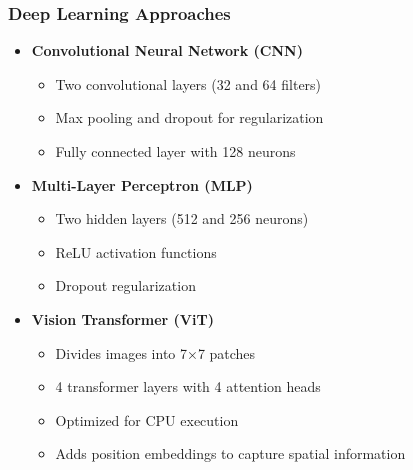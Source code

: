 \documentclass{beamer}
\begin{document}
\begin{frame}
\frametitle{Deep Learning Approaches}

\begin{itemize}
\item \textbf{Convolutional Neural Network (CNN)}
    \begin{itemize}
        \item Two convolutional layers (32 and 64 filters)
        \item Max pooling and dropout for regularization
        \item Fully connected layer with 128 neurons
    \end{itemize}
\item \textbf{Multi-Layer Perceptron (MLP)}
    \begin{itemize}
        \item Two hidden layers (512 and 256 neurons)
        \item ReLU activation functions
        \item Dropout regularization
    \end{itemize}
\item \textbf{Vision Transformer (ViT)}
    \begin{itemize}
        \item Divides images into 7×7 patches
        \item 4 transformer layers with 4 attention heads
        \item Optimized for CPU execution
        \item Adds position embeddings to capture spatial information
    \end{itemize}
\end{itemize}

\end{frame}
\end{document}
